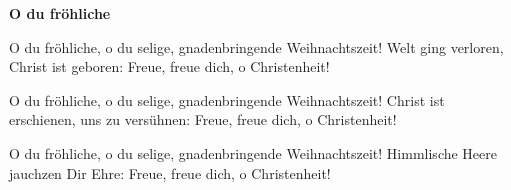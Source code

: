 \documentclass[10pt]{article}
\begin{document}
{\Large
\begin{guitar}
    \textbf{O du fröhliche}


    O du fröhliche, o du selige,
    gnadenbringende Weihnachtszeit!
    Welt ging verloren, Christ ist geboren:
    Freue, freue dich, o Christenheit!


    O du fröhliche, o du selige,
    gnadenbringende Weihnachtszeit!
    Christ ist erschienen, uns zu versühnen:
    Freue, freue dich, o Christenheit!


    O du fröhliche, o du selige,
    gnadenbringende Weihnachtszeit!
    Himmlische Heere jauchzen Dir Ehre:
    Freue, freue dich, o Christenheit!

\end{guitar}
}
\end{document}
